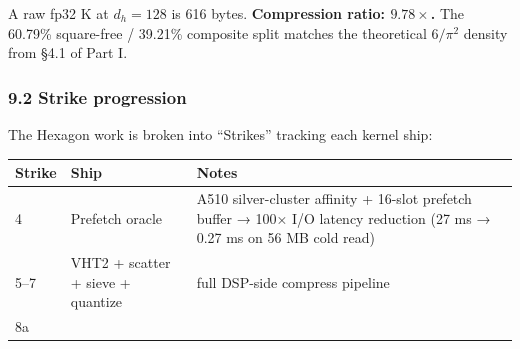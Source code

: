\documentclass[
  11pt,
]{article}
\begin{document}
A raw fp32 K at \(d_h=128\) is 616 bytes. \textbf{Compression ratio:
\(9.78\times\).} The 60.79\% square-free / 39.21\% composite split
matches the theoretical \(6/\pi^2\) density from §4.1 of Part I.

\hypertarget{strike-progression}{%
\subsubsection{9.2 Strike progression}\label{strike-progression}}

The Hexagon work is broken into ``Strikes'' tracking each kernel ship:

\begin{longtable}[]{@{}lll@{}}
\toprule
\begin{minipage}[b]{0.35\columnwidth}\raggedright
Strike\strut
\end{minipage} & \begin{minipage}[b]{0.26\columnwidth}\raggedright
Ship\strut
\end{minipage} & \begin{minipage}[b]{0.30\columnwidth}\raggedright
Notes\strut
\end{minipage}\tabularnewline
\midrule
\endhead
\begin{minipage}[t]{0.35\columnwidth}\raggedright
4\strut
\end{minipage} & \begin{minipage}[t]{0.26\columnwidth}\raggedright
Prefetch oracle\strut
\end{minipage} & \begin{minipage}[t]{0.30\columnwidth}\raggedright
A510 silver-cluster affinity + 16-slot prefetch buffer → 100× I/O
latency reduction (27 ms → 0.27 ms on 56 MB cold read)\strut
\end{minipage}\tabularnewline
\begin{minipage}[t]{0.35\columnwidth}\raggedright
5--7\strut
\end{minipage} & \begin{minipage}[t]{0.26\columnwidth}\raggedright
VHT2 + scatter + sieve + quantize\strut
\end{minipage} & \begin{minipage}[t]{0.30\columnwidth}\raggedright
full DSP-side compress pipeline\strut
\end{minipage}\tabularnewline
\begin{minipage}[t]{0.35\columnwidth}\raggedright
8a\strut
\end{minipage} & \begin{minipage}[t]{0.26\columnwidth}\raggedright

\end{minipage}
\end{longtable}
\end{document}

